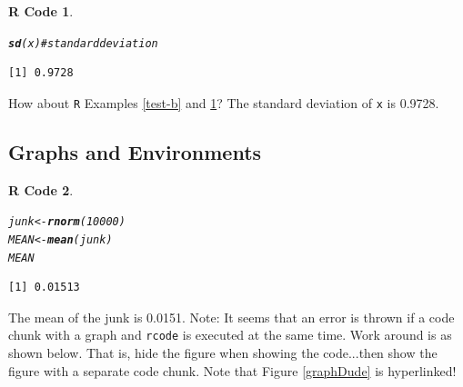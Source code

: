 \documentclass{article}\usepackage[]{graphicx}\usepackage[]{color}
\makeatletter
\newcommand{\hlnum}[1]{\textcolor[rgb]{0.686,0.059,0.569}{#1}}%
\newcommand{\hlcom}[1]{\textcolor[rgb]{0.678,0.584,0.686}{\textit{#1}}}%
\newcommand{\hlstd}[1]{\textcolor[rgb]{0.345,0.345,0.345}{#1}}%
\newcommand{\hlkwb}[1]{\textcolor[rgb]{0.69,0.353,0.396}{#1}}%
\newcommand{\hlkwd}[1]{\textcolor[rgb]{0.737,0.353,0.396}{\textbf{#1}}}%
\newenvironment{kframe}{%
 \def\at@end@of@kframe{}%
 \ifinner\ifhmode%
  \def\at@end@of@kframe{\end{minipage}}%
  \begin{minipage}{\columnwidth}%
 \fi\fi%
 \def\FrameCommand##1{\hskip\@totalleftmargin \hskip-\fboxsep
 \colorbox{shadecolor}{##1}\hskip-\fboxsep
     \hskip-\linewidth \hskip-\@totalleftmargin \hskip\columnwidth}%
 \MakeFramed {\advance\hsize-\width
   \@totalleftmargin\z@ \linewidth\hsize
   \@setminipage}}%
 {\par\unskip\endMakeFramed%
 \at@end@of@kframe}
\newenvironment{knitrout}{}{} %
\theoremstyle{rcode}
\newtheorem{rcode}{R Code}[section]
\makeatother
\begin{document}
\begin{knitrout}
\color{fgcolor}\begin{kframe}
\begin{rcode}\label{test-c}\hfill{}\begin{alltt}
\hlkwd{sd}\hlstd{(x)} \hlcom{# standard deviation}
\end{alltt}
\begin{verbatim}
[1] 0.9728
\end{verbatim}
\end{rcode}\end{kframe}
\end{knitrout}


How about \texttt{R} Examples \ref{test-b} and \ref{test-c}?  The standard deviation of \texttt{x} is 0.9728.

\clearpage
\subsection{Graphs and Environments}

\begin{knitrout}
\color{fgcolor}\begin{kframe}
\begin{rcode}\label{plot1}\hfill{}\begin{alltt}
\hlstd{junk} \hlkwb{<-} \hlkwd{rnorm}\hlstd{(}\hlnum{10000}\hlstd{)}
\hlstd{MEAN} \hlkwb{<-} \hlkwd{mean}\hlstd{(junk)}
\hlstd{MEAN}
\end{alltt}
\begin{verbatim}
[1] 0.01513
\end{verbatim}
\end{rcode}\end{kframe}
\end{knitrout}


The mean of the junk is 0.0151.  Note: It seems that an error is thrown if
a code chunk with a graph and \texttt{rcode} is executed at the same time.  Work around is
as shown below.  That is, hide the figure when showing the code...then show the figure
with a separate code chunk.  Note that Figure \ref{graphDude} is hyperlinked!
\end{document}

